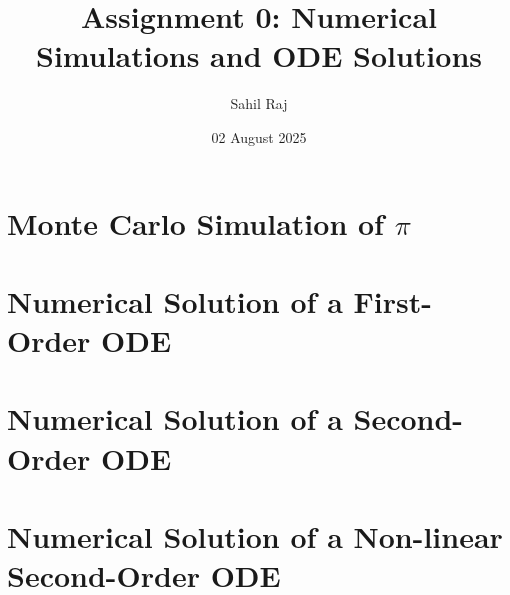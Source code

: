 \documentclass[12pt,a4paper]{report}
\title{Assignment 0: Numerical Simulations and ODE Solutions}
\author{Sahil Raj}
\date{02 August 2025}
\begin{document}
\maketitle
\tableofcontents
\clearpage

\chapter{Monte Carlo Simulation of $\pi$}


\chapter{Numerical Solution of a First-Order ODE}


\chapter{Numerical Solution of a Second-Order ODE}


\chapter{Numerical Solution of a Non-linear Second-Order ODE}

\end{document}
